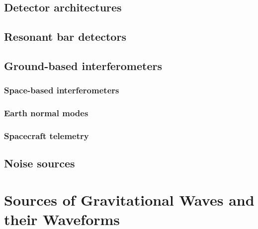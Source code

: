 \documentclass{kentigern}
\theoremstyle{definition}
\begin{document}
 

 \section{Detector architectures}
 \label{sec:detect-arch}

 \section{Resonant bar detectors}
 \label{sec:reson-bar-detect}

 \section{Ground-based interferometers}
 \label{sec:ground-based-interf}
 


 \subsection{Space-based interferometers}
 \label{sec:space-based-interf}

 \subsection{Earth normal modes}
 \label{sec:earth-normal-modes}

 \subsection{Spacecraft telemetry}
 \label{sec:spacecraft-telemetry}
 
 \section{Noise sources}
 \label{sec:an-overview-noise}
 


 \chapter{Sources of Gravitational Waves and their Waveforms}
 \label{cha:sourc-grav-waves}
 
\end{document}
